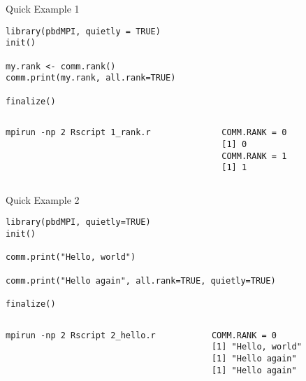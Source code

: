 \begin{frame}[fragile]
  \begin{exampleblock}{Quick Example 1}
  \centering
\begin{lstlisting}[title=Rank Query: 1\_rank.r]
library(pbdMPI, quietly = TRUE)
init()

my.rank <- comm.rank()
comm.print(my.rank, all.rank=TRUE)

finalize()
\end{lstlisting}
  \begin{columns}[t,onlytextwidth]
    \begin{column}{0.62\textwidth}
\begin{lstlisting}[backgroundcolor=\color{white},keywordstyle=\color{black},title=Execute this 
script via:]
mpirun -np 2 Rscript 1_rank.r
\end{lstlisting}    
    \end{column}
    \hfill
    \begin{column}{0.35\textwidth}
\begin{lstlisting}[title=Sample Output:]
COMM.RANK = 0
[1] 0
COMM.RANK = 1
[1] 1
\end{lstlisting}
    \end{column}
​  \end{columns}
  \end{exampleblock}
\end{frame}



\begin{frame}[fragile]
  \begin{exampleblock}{Quick Example 2}
\begin{lstlisting}[title=Hello World: 2\_hello.r]
library(pbdMPI, quietly=TRUE)
init()

comm.print("Hello, world")

comm.print("Hello again", all.rank=TRUE, quietly=TRUE)

finalize()
\end{lstlisting}
  \begin{columns}[t,onlytextwidth]
    \begin{column}{0.58\textwidth}
\begin{lstlisting}[backgroundcolor=\color{white},keywordstyle=\color{black},title=Execute this 
script via:]
mpirun -np 2 Rscript 2_hello.r
\end{lstlisting}    
    \end{column}
    \hfill
    \begin{column}{0.4\textwidth}
\begin{lstlisting}[title=Sample Output:]
COMM.RANK = 0
[1] "Hello, world"
[1] "Hello again"
[1] "Hello again"
\end{lstlisting}
    \end{column}
​  \end{columns}
  \end{exampleblock}
\end{frame}




